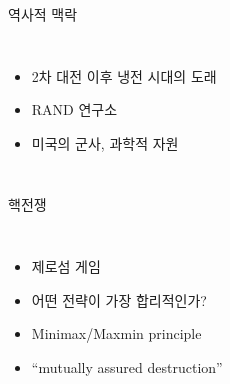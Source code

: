 \documentclass[final]{beamer}
\begin{document}
\begin{frame}[t]{역사적 맥락}
	\begin{columns}[c]
		\column{12em}
		\column{20em}
		\begin{itemize}
			\item 2차 대전 이후 냉전 시대의 도래 
			\item RAND 연구소 
			\item 미국의 군사, 과학적 자원
		\end{itemize}
	\end{columns}
\end{frame}

\begin{frame}[t]{핵전쟁}
	\begin{columns}[c]
		\column{15em}
		\begin{itemize}
			\item 제로섬 게임
			\item 어떤 전략이 가장 합리적인가?  
			\item Minimax/Maxmin principle 
			\item ``mutually assured destruction''
		\end{itemize}
		\column{17em}
	\end{columns}
\end{frame}
\end{document}
